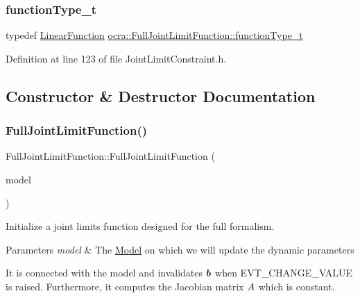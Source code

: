 \subsubsection{\texorpdfstring{function\+Type\+\_\+t}{functionType\_t}}
{\footnotesize\ttfamily typedef \hyperlink{classocra_1_1LinearFunction}{Linear\+Function} \hyperlink{classocra_1_1FullJointLimitFunction_a3ae743a316981d67933248a9d58f58fb}{ocra\+::\+Full\+Joint\+Limit\+Function\+::function\+Type\+\_\+t}}



Definition at line 123 of file Joint\+Limit\+Constraint.\+h.



\subsection{Constructor \& Destructor Documentation}
\hypertarget{classocra_1_1FullJointLimitFunction_af49c77d067fe584cf6d3884eb33b2ed0}{}\label{classocra_1_1FullJointLimitFunction_af49c77d067fe584cf6d3884eb33b2ed0} 
\subsubsection{\texorpdfstring{Full\+Joint\+Limit\+Function()}{FullJointLimitFunction()}}
{\footnotesize\ttfamily Full\+Joint\+Limit\+Function\+::\+Full\+Joint\+Limit\+Function (\begin{DoxyParamCaption}\item[{const \hyperlink{classocra_1_1Model}{Model} \&}]{model }\end{DoxyParamCaption})}

Initialize a joint limits function designed for the full formalism.


\begin{DoxyParams}{Parameters}
{\em model} & The \hyperlink{classocra_1_1Model}{Model} on which we will update the dynamic parameters\\
\hline
\end{DoxyParams}
It is connected with the model and invalidates $ \mbox{\boldmath${b}$} $ when E\+V\+T\+\_\+\+C\+H\+A\+N\+G\+E\+\_\+\+V\+A\+L\+UE is raised. Furthermore, it computes the Jacobian matrix $ A $ which is constant. 

